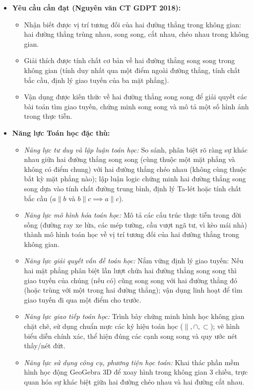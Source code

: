 \documentclass[12pt, a4paper]{article}
\begin{document}
\begin{itemize}[leftmargin=1.2cm]
    \item \textbf{Yêu cầu cần đạt (Nguyên văn CT GDPT 2018):}
    \begin{itemize}[leftmargin=0.6cm]
        \item Nhận biết được vị trí tương đối của hai đường thẳng trong không gian: hai đường thẳng trùng nhau, song song, cắt nhau, chéo nhau trong không gian.
        \item Giải thích được tính chất cơ bản về hai đường thẳng song song trong không gian (tính duy nhất qua một điểm ngoài đường thẳng, tính chất bắc cầu, định lý giao tuyến của ba mặt phẳng).
        \item Vận dụng được kiến thức về hai đường thẳng song song để giải quyết các bài toán tìm giao tuyến, chứng minh song song và mô tả một số hình ảnh trong thực tiễn.
    \end{itemize}

    \item \textbf{Năng lực Toán học đặc thù:}
    \begin{itemize}[leftmargin=0.6cm]
        \item \textit{Năng lực tư duy và lập luận toán học:} So sánh, phân biệt rõ ràng sự khác nhau giữa hai đường thẳng song song (cùng thuộc một mặt phẳng và không có điểm chung) với hai đường thẳng chéo nhau (không cùng thuộc bất kỳ mặt phẳng nào); lập luận logic chứng minh hai đường thẳng song song dựa vào tính chất đường trung bình, định lý Ta-lét hoặc tính chất bắc cầu ($a \parallel b$ và $b \parallel c \implies a \parallel c$).
        \item \textit{Năng lực mô hình hóa toán học:} Mô tả các cấu trúc thực tiễn trong đời sống (đường ray xe lửa, các mép tường, cầu vượt ngã tư, vì kèo mái nhà) thành mô hình toán học về vị trí tương đối của hai đường thẳng trong không gian.
        \item \textit{Năng lực giải quyết vấn đề toán học:} Nắm vững định lý giao tuyến: Nếu hai mặt phẳng phân biệt lần lượt chứa hai đường thẳng song song thì giao tuyến của chúng (nếu có) cũng song song với hai đường thẳng đó (hoặc trùng với một trong hai đường thẳng); vận dụng linh hoạt để tìm giao tuyến đi qua một điểm cho trước.
        \item \textit{Năng lực giao tiếp toán học:} Trình bày chứng minh hình học không gian chặt chẽ, sử dụng chuẩn mực các ký hiệu toán học ($\parallel, \cap, \subset$); vẽ hình biểu diễn chính xác, thể hiện đúng các cạnh song song và quy ước nét thấy/nét đứt.
        \item \textit{Năng lực sử dụng công cụ, phương tiện học toán:} Khai thác phần mềm hình học động GeoGebra 3D để xoay hình trong không gian 3 chiều, trực quan hóa sự khác biệt giữa hai đường chéo nhau và hai đường cắt nhau.
    \end{itemize}


\end{itemize}
\end{document}
